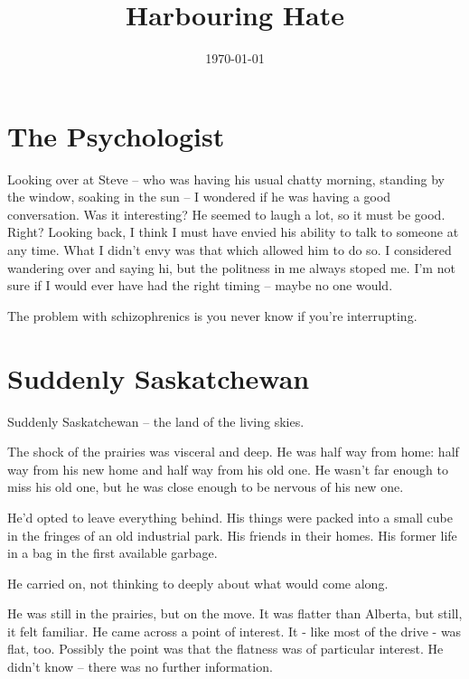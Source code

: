 \documentclass[fontsize=12pt,english]{scrreprt}
\title{Harbouring Hate}
\author{}
\date{\today}
\begin{document}
\maketitle
\tableofcontents


\newpage


\section{The Psychologist}

Looking over at Steve -- who was having his usual chatty morning,
standing by the window, soaking in the sun -- I wondered if he was
having a good conversation. Was it interesting? He seemed to laugh a
lot, so it must be good. Right? Looking back, I think I must have
envied his ability to talk to someone at any time. What I didn't envy
was that which allowed him to do so. I considered wandering over and
saying hi, but the politness in me always stoped me. I'm not sure if I
would ever have had the right timing -- maybe no one would.

The problem with schizophrenics is you never know if you're
interrupting.

\newpage

\section{Suddenly Saskatchewan}

Suddenly Saskatchewan -- the land of the living skies.

The shock of the prairies was visceral and deep. He was half way from
home: half way from his new home and half way from his old one. He
wasn't far enough to miss his old one, but he was close enough to be
nervous of his new one.

He'd opted to leave everything behind. His things were packed into a
small cube in the fringes of an old industrial park. His friends in
their homes. His former life in a bag in the first available garbage.

He carried on, not thinking to deeply about what would come along.

He was still in the prairies, but on the move. It was flatter than
Alberta, but still, it felt familiar. He came across a point of
interest. It - like most of the drive - was flat, too. Possibly the
point was that the flatness was of particular interest. He didn't know
-- there was no further information.
\end{document}
